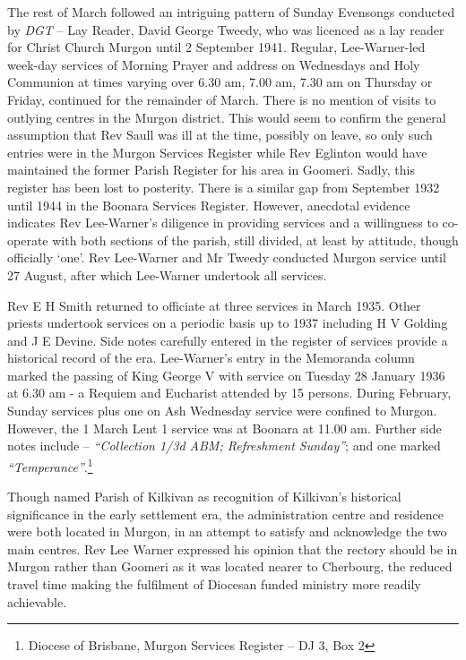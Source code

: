 The rest of March followed an intriguing pattern of Sunday Evensongs conducted by \emph{DGT} -- Lay Reader, David George Tweedy, who was licenced as a lay reader for Christ Church Murgon until 2 September 1941. Regular, Lee-Warner-led week-day services of Morning Prayer and address on Wednesdays and Holy Communion at times varying over 6.30 am, 7.00 am, 7.30 am on Thursday or Friday, continued for the remainder of March. There is no mention of visits to outlying centres in the Murgon district. This would seem to confirm the general assumption that Rev Saull was ill at the time, possibly on leave, so only such entries were in the Murgon Services Register while Rev Eglinton would have maintained the former Parish Register for his area in Goomeri. Sadly, this register has been lost to posterity. There is a similar gap from September 1932 until 1944 in the Boonara Services Register. However, anecdotal evidence indicates Rev Lee-Warner's diligence in providing services and a willingness to co-operate with both sections of the parish, still divided, at least by attitude, though officially `one'. Rev Lee-Warner and Mr Tweedy conducted Murgon service until 27 August, after which Lee-Warner undertook all services.



Rev E H Smith returned to officiate at three services in March 1935. Other priests undertook services on a periodic basis up to 1937 including H V Golding and J E Devine. Side notes carefully entered in the register of services provide a historical record of the era. Lee-Warner's entry in the Memoranda column marked the passing of King George V with service on Tuesday 28 January 1936 at 6.30 am - a Requiem and Eucharist attended by 15 persons. During February, Sunday services plus one on Ash Wednesday service were confined to Murgon. However, the 1 March Lent 1 service was at Boonara at 11.00 am. Further side notes include -- \emph{``Collection 1/3d ABM; Refreshment Sunday''}; and one marked \emph{``Temperance''}.\footnote{Diocese of Brisbane, Murgon Services Register -- DJ 3, Box 2}


Though named Parish of Kilkivan as recognition of Kilkivan's historical significance in the early settlement era, the administration centre and residence were both located in Murgon, in an attempt to satisfy and acknowledge the two main centres. Rev Lee Warner expressed his opinion that the rectory should be in Murgon rather than Goomeri as it was located nearer to Cherbourg, the reduced travel time making the fulfilment of Diocesan funded ministry more readily achievable.




